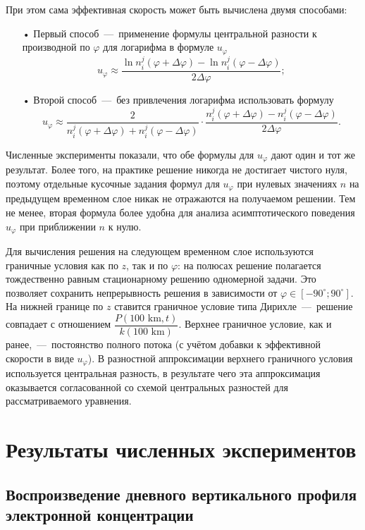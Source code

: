 \documentclass[14pt, a4paper, fleqn]{extarticle}
\begin{document}
\smallskip

При этом сама эффективная скорость может быть вычислена двумя способами: 
\begin{itemize}
\item[•] Первый способ~---~применение формулы центральной разности к производной по $\varphi$ для логарифма в формуле $u_\varphi$ $$u_\varphi\approx \dfrac{\ln n^j_i(\varphi+\Delta\varphi)-\ln n^j_i(\varphi-\Delta\varphi)}{2\Delta\varphi};$$ 
\item[•] Второй способ~---~без привлечения логарифма использовать формулу $$u_\varphi \approx \dfrac{2}{n_i^j(\varphi+\Delta\varphi)+n_i^j(\varphi-\Delta\varphi)}\cdot\dfrac{n_i^j(\varphi+\Delta\varphi)-n_i^j(\varphi-\Delta\varphi)}{2\Delta\varphi}.$$
\end{itemize}

Численные эксперименты показали, что обе формулы для $u_\varphi$ дают один и тот же результат. Более того, на практике решение никогда не достигает чистого нуля, поэтому отдельные кусочные задания формул для $u_\varphi$ при нулевых значениях $n$ на предыдущем временном слое никак не отражаются на получаемом решении. Тем не менее, вторая формула более удобна для анализа асимптотического поведения $u_\varphi$ при приближении $n$ к нулю.

Для вычисления решения на следующем временном слое используются граничные условия как по $z$, так и по $\varphi$: на полюсах решение полагается тождественно равным стационарному решению одномерной задачи. Это позволяет сохранить непрерывность решения в зависимости от $\varphi \in [-90^\circ; 90^\circ]$. На нижней границе по $z$ ставится граничное условие типа Дирихле~---~решение совпадает с отношением $\dfrac{P(100\mbox{ km}, t)}{k(100\mbox{ km})}$. Верхнее граничное условие, как и ранее,~---~постоянство полного потока (с учётом добавки к эффективной скорости в виде $u_\varphi$). В разностной аппроксимации верхнего граничного условия используется центральная разность, в результате чего эта аппроксимация оказывается согласованной со схемой центральных разностей для рассматриваемого уравнения.


\section{Результаты численных экспериментов}

\subsection{Воспроизведение дневного вертикального профиля электронной концентрации}
\end{document}
